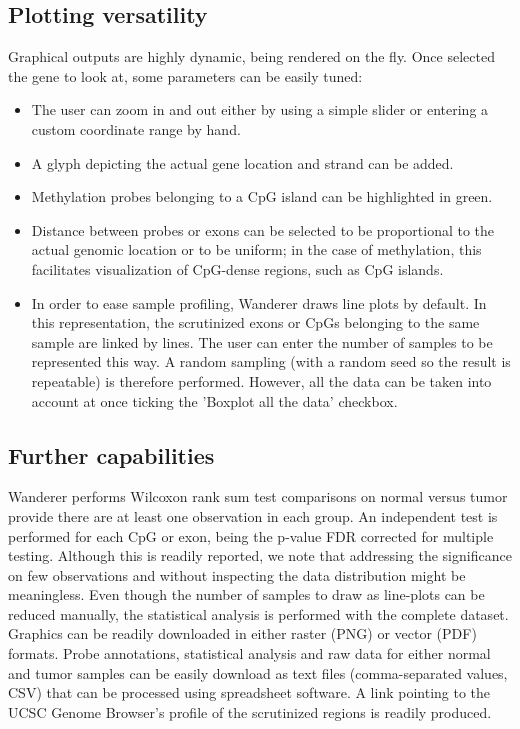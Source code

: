 \documentclass{bmcart}
\begin{document}
 
\subsection*{Plotting versatility}

Graphical outputs are highly dynamic, being rendered on the fly. Once selected the gene to look at, some parameters can be easily tuned:
\begin{itemize}
\item The user can zoom in and out either by using a simple slider or entering a custom coordinate range by hand. 
\item A glyph depicting the actual gene location and strand can be added. 
\item Methylation probes belonging to a CpG island can be highlighted in green. 
\item Distance between probes or exons can be selected to be proportional to the actual genomic location or to be uniform; in the case of methylation, this facilitates visualization of CpG-dense regions, such as CpG islands. 
\item In order to ease sample profiling, Wanderer draws line plots by default. In this representation, the scrutinized exons or CpGs belonging to the same sample are linked by lines. The user can enter the number of samples to be represented this way. A random sampling (with a random seed so the result is repeatable) is therefore performed. However, all the data can be taken into account at once ticking the 'Boxplot all the data' checkbox.

\end{itemize}


\subsection*{Further capabilities}
Wanderer performs Wilcoxon rank sum test comparisons on normal versus tumor provide there are at least one observation in each group. An independent test is performed for each CpG or exon, being the p-value FDR corrected for multiple testing. Although this is readily reported, we note that addressing the significance on few observations and without inspecting the data distribution might be meaningless. Even though the number of samples to draw as line-plots can be reduced manually, the statistical analysis is performed with the complete dataset.\\

Graphics can be readily downloaded in either raster (PNG) or vector (PDF) formats. Probe annotations, statistical analysis and raw data for either normal and tumor samples can be easily download as text files (comma-separated values, CSV) that can be processed using spreadsheet software. A link pointing to the UCSC Genome Browser's profile of the scrutinized regions is readily produced.\\
\end{document}
